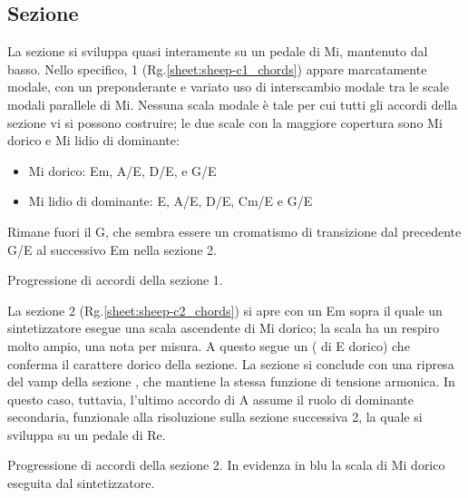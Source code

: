 \documentclass[class=book, crop=false, oneside, 12pt]{standalone}
\begin{document}
    \subsection{Sezione }
    La sezione  si sviluppa quasi interamente su un pedale di Mi, mantenuto dal basso. Nello specifico, 1 (Rg.\ref{sheet:sheep-c1_chords}) appare marcatamente modale, con un preponderante e variato uso di interscambio modale tra le scale modali parallele di Mi. Nessuna scala modale è tale per cui tutti gli accordi della sezione vi si possono costruire; le due scale con la maggiore copertura sono Mi dorico e Mi lidio di dominante:
    \begin{itemize}
        \item Mi dorico: Em, A/E, D/E, e G/E
        \item Mi lidio di dominante: E, A/E, D/E, C\sharp m/E e G/E
    \end{itemize}

    Rimane fuori il G\flat, che sembra essere un cromatismo di transizione dal precedente G/E al successivo Em nella sezione 2.
    
    \begin{sheet}[htb]
        \centering
        \caption[Progressione di accordi della sezione 1.]{Progressione di accordi della sezione 1.}
        \label{sheet:sheep-c1_chords}
    \end{sheet}

    La sezione 2 (Rg.\ref{sheet:sheep-c2_chords})  si apre con un Em  sopra il quale un sintetizzatore esegue una scala ascendente di Mi dorico; la scala ha un respiro molto ampio, una nota per misura. A questo segue un  ( di E dorico) che conferma il carattere dorico della sezione. La sezione si conclude con una ripresa del vamp della sezione , che mantiene la stessa funzione di tensione armonica. In questo caso, tuttavia, l'ultimo accordo di A assume il ruolo di dominante secondaria, funzionale alla risoluzione sulla sezione successiva 2, la quale si sviluppa su un pedale di Re.

    \begin{sheet}[htb]
        \centering
        \caption[Progressione di accordi della sezione 2.]{Progressione di accordi della sezione 2. In evidenza in blu la scala di Mi dorico eseguita dal sintetizzatore.}
        \label{sheet:sheep-c2_chords}
    \end{sheet}
\end{document}
